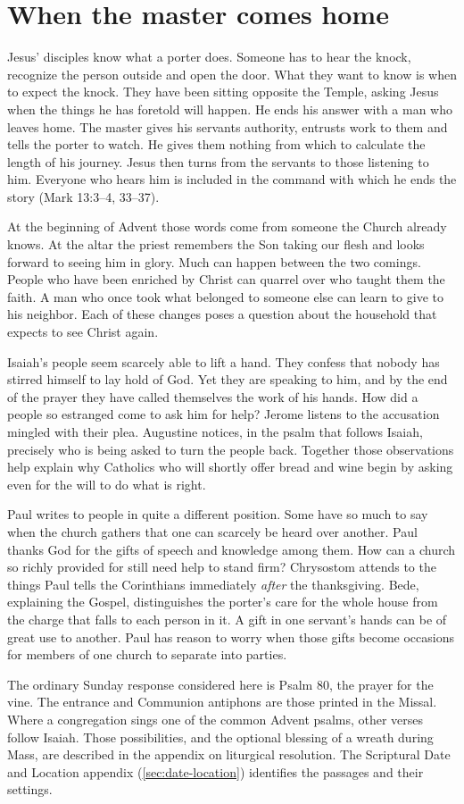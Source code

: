 \section{When the master comes home}

Jesus' disciples know what a porter does. Someone has to hear the knock, recognize the person outside and open the door. What they want to know is when to expect the knock. They have been sitting opposite the Temple, asking Jesus when the things he has foretold will happen. He ends his answer with a man who leaves home. The master gives his servants authority, entrusts work to them and tells the porter to watch. He gives them nothing from which to calculate the length of his journey. Jesus then turns from the servants to those listening to him. Everyone who hears him is included in the command with which he ends the story (Mark 13:3--4, 33--37).

At the beginning of Advent those words come from someone the Church already knows. At the altar the priest remembers the Son taking our flesh and looks forward to seeing him in glory. Much can happen between the two comings. People who have been enriched by Christ can quarrel over who taught them the faith. A man who once took what belonged to someone else can learn to give to his neighbor. Each of these changes poses a question about the household that expects to see Christ again.

Isaiah's people seem scarcely able to lift a hand. They confess that nobody has stirred himself to lay hold of God. Yet they are speaking to him, and by the end of the prayer they have called themselves the work of his hands. How did a people so estranged come to ask him for help? Jerome listens to the accusation mingled with their plea. Augustine notices, in the psalm that follows Isaiah, precisely who is being asked to turn the people back. Together those observations help explain why Catholics who will shortly offer bread and wine begin by asking even for the will to do what is right.

Paul writes to people in quite a different position. Some have so much to say when the church gathers that one can scarcely be heard over another. Paul thanks God for the gifts of speech and knowledge among them. How can a church so richly provided for still need help to stand firm? Chrysostom attends to the things Paul tells the Corinthians immediately \emph{after} the thanksgiving. Bede, explaining the Gospel, distinguishes the porter's care for the whole house from the charge that falls to each person in it. A gift in one servant's hands can be of great use to another. Paul has reason to worry when those gifts become occasions for members of one church to separate into parties.

The ordinary Sunday response considered here is Psalm 80, the prayer for the vine. The entrance and Communion antiphons are those printed in the Missal. Where a congregation sings one of the common Advent psalms, other verses follow Isaiah. Those possibilities, and the optional blessing of a wreath during Mass, are described in the appendix on liturgical resolution. The Scriptural Date and Location appendix (\ref{sec:date-location}) identifies the passages and their settings.
